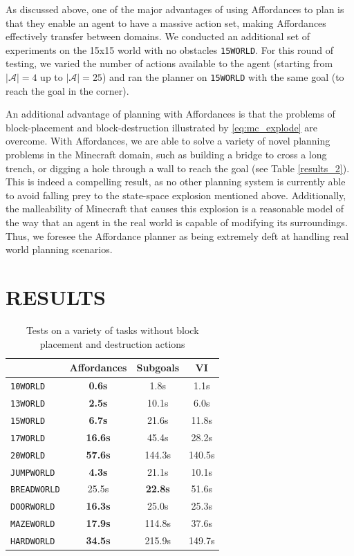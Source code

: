 \documentclass[]{article}
\begin{document}
As discussed above, one of the major advantages of using Affordances 
to plan is that they enable an agent to have a massive action set, 
making Affordances effectively transfer between domains. We 
conducted an additional set of experiments on the 15x15 world 
with no obstacles \texttt{15WORLD}. For this round of testing, we 
varied the number of actions available to the agent (starting from 
$|\mathcal{A}| = 4$ up to $|\mathcal{A}| = 25$) and ran the planner 
on \texttt{15WORLD} with the same goal (to reach the goal in the corner).


An additional advantage of planning with Affordances is that the 
problems of block-placement and block-destruction illustrated by 
\ref{eq:mc_explode} are overcome. With Affordances, we are able 
to solve a variety of novel planning problems in the Minecraft 
domain, such as building a bridge to cross a long trench, or digging 
a hole through a wall to reach the goal (see Table \ref{results_2}). 
This is indeed a compelling result, as no other planning system is 
currently able to avoid falling prey to the state-space explosion 
mentioned above. Additionally, the malleability of Minecraft that 
causes this explosion is a reasonable model of the way that an 
agent in the real world is capable of modifying its surroundings. 
Thus, we foresee the Affordance planner as being extremely deft 
at handling real world planning scenarios.

\section{RESULTS}

\begin{table}
\begin{tabular}{ l || c | c | c }
  & Affordances & Subgoals & VI \\
  \hline
  \texttt{10WORLD} 		&	{\bf 0.6s} 		&	 1.8s 		& 1.1s  \\
  \texttt{13WORLD} 		&	{\bf 2.5s} 	 	& 	10.1s 		& 6.0s  \\
  \texttt{15WORLD} 		&	{\bf 6.7s} 	 	& 	21.6s 		& 11.8s  \\
  \texttt{17WORLD} 		& 	{\bf 16.6s} 	& 	45.4s 		& 28.2s  \\
  \texttt{20WORLD} 		& 	{\bf 57.6s} 	& 	144.3s 		& 140.5s  \\
  \texttt{JUMPWORLD}  	& 	{\bf 4.3s} 		& 	21.1s 		& 10.1s \\
  \texttt{BREADWORLD}  	& 	25.5s		& 	{\bf 22.8s} 	& 51.6s \\
  \texttt{DOORWORLD}  	& 	{\bf 16.3s} 	& 	25.0s 		& 25.3s \\
  \texttt{MAZEWORLD}  	& 	{\bf 17.9s} 	& 	114.8s		& 37.6s \\
  \texttt{HARDWORLD} 	& 	{\bf 34.5s}  	& 	215.9s 		& 149.7s
\end{tabular} 
\label{results_1}
\caption{Tests on a variety of tasks without block placement and destruction actions}
\end{table}
\end{document}
